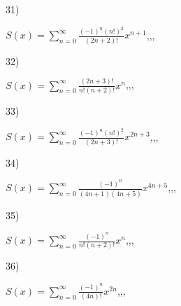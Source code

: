 \documentclass[11pt, ukrainian]{article}
\begin{document}
\par
\newpage
31) \space 
{%
{$S(x)=\sum\limits_{n=0}^{\infty}{\frac{{(-1)^n}{(n!)^2}}{(2n+2)!}}{x^{{n+1}}}$},,, \par \smallskip  
}
\par
\vspace{0.9cm}
32) \space 
{%
{$S(x)=\sum\limits_{n=0}^{\infty}{\frac{(2n+3)!}{n!(n+2)!}}{x^{n}}$},,, \par \smallskip  
}
\par
\vspace{0.9cm}
33) \space 
{%
{$S(x)=\sum\limits_{n=0}^{\infty}{\frac{{(-1)^n}{(n!)^2}}{(2n+3)!}}{x^{{2n+3}}}$},,, \par \smallskip  
}
\par
\vspace{0.9cm}
34) \space 
{%
{$S(x)=\sum\limits_{n=0}^{\infty}{\frac{(-1)^n}{(4n+1)(4n+5)}}{x^{{4n+5}}}$},,, \par \smallskip  
}
\par
\vspace{0.9cm}
35) \space 
{%
{$S(x)=\sum\limits_{n=0}^{\infty}{\frac{(-1)^n}{n!(n+2)!}}{x^{{n}}}$},,, \par \smallskip  
}
\par
\vspace{0.9cm}
36) \space 
{%
{$S(x)=\sum\limits_{n=0}^{\infty}{\frac{(-1)^n}{(4n)!}}{x^{{2n}}}$},,, \par \smallskip  
}
\end{document}
